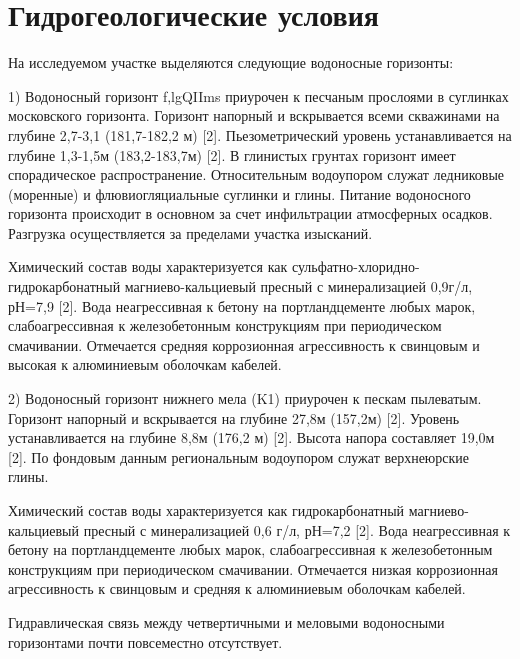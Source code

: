 \chapter*{Гидрогеологические условия} 

На исследуемом участке выделяются следующие водоносные горизонты:

1) Водоносный горизонт f,lgQIIms приурочен к песчаным прослоями в суглинках московского горизонта. Горизонт напорный и вскрывается всеми скважинами на глубине 2,7-3,1 (181,7-182,2 м) [2]. Пьезометрический уровень устанавливается на глубине 1,3-1,5м (183,2-183,7м) [2]. В глинистых грунтах горизонт имеет спорадическое распространение. Относительным водоупором служат ледниковые (моренные) и флювиогляциальные суглинки и глины. Питание водоносного горизонта происходит в основном за счет инфильтрации атмосферных осадков. Разгрузка осуществляется за пределами участка изысканий.

Химический состав воды характеризуется как сульфатно-хлоридно-гидрокарбонатный магниево-кальциевый пресный с минерализацией 0,9г/л, рН=7,9 [2]. Вода неагрессивная к бетону на портландцементе любых марок, слабоагрессивная к железобетонным конструкциям при периодическом смачивании. Отмечается средняя коррозионная агрессивность к свинцовым и высокая к алюминиевым оболочкам кабелей.

2) Водоносный горизонт нижнего мела (K1) приурочен к пескам пылеватым. Горизонт напорный и вскрывается на глубине 27,8м (157,2м) [2]. Уровень устанавливается на глубине 8,8м (176,2 м) [2]. Высота напора составляет 19,0м [2]. По фондовым данным региональным водоупором служат верхнеюрские глины.

Химический состав воды характеризуется как гидрокарбонатный магниево-кальциевый пресный с минерализацией 0,6 г/л, рН=7,2 [2]. Вода неагрессивная к бетону на портландцементе любых марок, слабоагрессивная к железобетонным конструкциям при периодическом смачивании. Отмечается низкая коррозионная агрессивность к свинцовым и средняя к алюминиевым оболочкам кабелей.

Гидравлическая связь между четвертичными и меловыми водоносными горизонтами почти повсеместно отсутствует. 